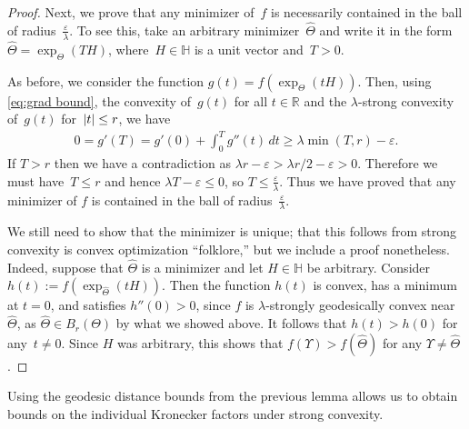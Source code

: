 \documentclass[aos]{imsart}
\theoremstyle{definition}
\numberwithin{equation}{section}
\DeclarePairedDelimiter{\abs}{\lvert}{\rvert}
\newcommand{\R}{{\mathbb{R}}}
\renewcommand{\H}{{\mathbb{H}}}
\newcommand{\htheta}{\widehat{\Theta}}
\newcommand{\eps}{\varepsilon}
\newcommand{\AR}[1]{{\color{orange}[AR: #1]}}
\newcommand{\AR}[1]{{}}
\begin{document}
\begin{proof}
Next, we prove that any minimizer of~$f$ is necessarily contained in the ball of radius~$\frac\eps\lambda$.
To see this, take an arbitrary minimizer~$\htheta$ and write it in the form $\htheta = \exp_\Theta(TH)$, where~$H\in \H$ is a unit vector and~$T>0$.


As before, we consider the function $g(t) = f(\exp_\Theta(tH))$.
Then, using \cref{eq:grad bound}, the convexity of~$g(t)$ for all $t\in\R$ and the $\lambda$-strong convexity of~$g(t)$ for~$\abs t \leq  r$, we have
\begin{align*}
  0 = g'(T) = g'(0) + \int_0^T g''(t) \, dt \geq \lambda \min(T,  r) - \eps.
\end{align*}
If $T> r$ then we have a contradiction as $\lambda r - \eps > \lambda r/2 - \eps > 0$.
Therefore we must have~$T\leq r$ and hence $\lambda T - \eps \leq 0$, so $T \leq \frac\eps\lambda$.
Thus we have proved that any minimizer of $f$ is contained in the ball of radius~$\frac\eps\lambda$.

We still need to show that the minimizer is unique; that this follows from strong convexity is convex optimization ``folklore,'' but we include a proof nonetheless.
Indeed, suppose that $\htheta$ is a minimizer and let $H\in \H$ be arbitrary.
Consider $h(t) := f(\exp_{\htheta}(tH))$.
Then the function $h(t)$ is convex, has a minimum at $t=0$, and satisfies $h''(0) > 0$, since $f$ is $\lambda$-strongly geodesically convex near~$\htheta$, as $\htheta \in B_r(\Theta)$ by what we showed above.
It follows that $h(t) > h(0)$ for any~$t\neq0$.
Since $H$ was arbitrary, this shows that $f(\Upsilon) > f(\htheta)$ for any $\Upsilon\neq \htheta$.
\end{proof}
Using the geodesic distance bounds from the previous lemma allows us to obtain bounds on the individual Kronecker factors under strong convexity.
\end{document}
